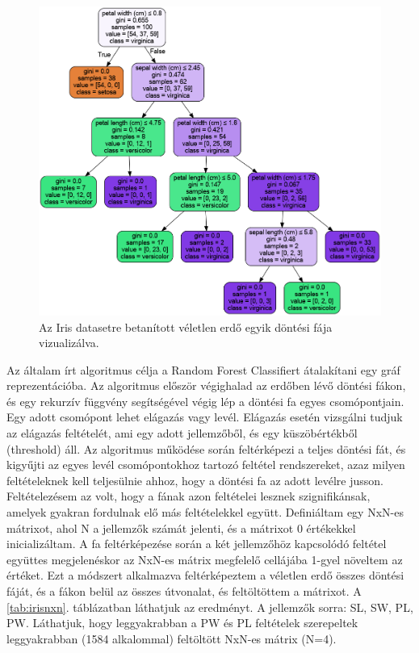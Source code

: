 \begin{figure}[ht]
	\centering
	\includegraphics[width=0.9\columnwidth]{figures/network_iris_tree.png}
	\caption{Az Iris datasetre betanított véletlen erdő egyik döntési fája
	vizualizálva.}
\end{figure}

Az általam írt algoritmus célja a Random Forest Classifiert átalakítani egy gráf reprezentációba. Az algoritmus először végighalad az erdőben lévő döntési fákon, és egy rekurzív függvény segítségével végig lép a döntési fa egyes csomópontjain. Egy adott csomópont lehet elágazás vagy levél. Elágazás esetén vizsgálni tudjuk az elágazás feltételét, ami egy adott jellemzőből, és egy küszöbértékből (threshold) áll. Az algoritmus működése során feltérképezi a teljes döntési fát, és kigyűjti az egyes levél csomópontokhoz tartozó feltétel rendszereket, azaz milyen feltételeknek kell teljesülnie ahhoz, hogy a döntési fa az adott levélre jusson. Feltételezésem az volt, hogy a fának azon feltételei lesznek szignifikánsak, amelyek gyakran fordulnak elő más feltételekkel együtt. Definiáltam egy NxN-es mátrixot, ahol N a jellemzők számát jelenti, és a mátrixot 0 értékekkel inicializáltam. A fa feltérképezése során a két jellemzőhöz kapcsolódó feltétel együttes megjelenéskor az NxN-es mátrix megfelelő cellájába 1-gyel növeltem az értéket. Ezt a módszert alkalmazva feltérképeztem a véletlen erdő összes döntési fáját, és a fákon belül az összes útvonalat, és feltöltöttem a mátrixot. A \ref{tab:irisnxn}. táblázatban láthatjuk az eredményt. A jellemzők sorra: SL, SW, PL, PW\@. Láthatjuk, hogy leggyakrabban a PW és PL feltételek szerepeltek leggyakrabban (1584 alkalommal) feltöltött NxN-es mátrix (N=4). 

